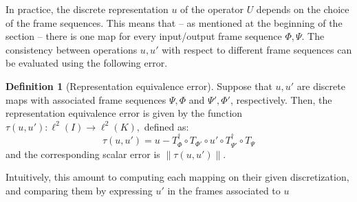 \documentclass[reqno,10pt]{amsart}
\theoremstyle{plain}
\theoremstyle{definition}
\newtheorem{defn}{Definition}
\begin{document}
    In practice, the discrete representation $u$ of the operator $U$ depends on the choice of the frame sequences. This means that -- as mentioned at the beginning of the section -- there is one map for every input/output frame sequence $\Phi,\Psi$. The consistency between operations $u,u'$ with respect to different frame sequences can be evaluated using the following error.
    \begin{defn}[Representation equivalence error] Suppose that $u,u'$ are discrete maps with associated frame sequences $\Psi,\Phi$ and $\Psi',\Phi'$, respectively. Then, the representation equivalence error is given by the function $\tau(u,u') : \ell^2(I) \to \ell^2(K),$ defined as:
    $$ \tau(u,u') = u - T^\dag_\Phi \circ T_{\Phi'} \circ u' \circ T_{\Psi'}^\dag \circ T_\Psi$$
    and the corresponding scalar error is $\|\tau(u,u')\|$.
    \end{defn}
    \noindent Intuitively, this amount to computing each mapping on their given discretization, and comparing them by expressing $u'$ in the frames associated to $u$



\end{document}
